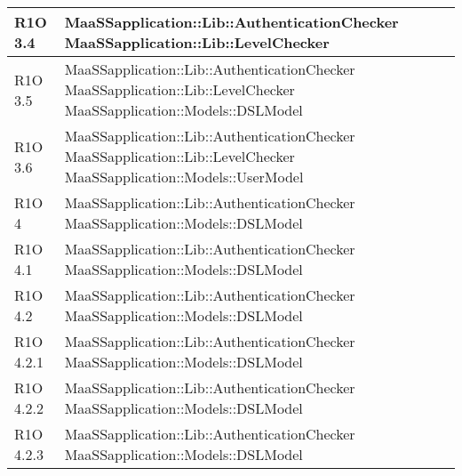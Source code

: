 \begin{center}
\begin{longtable}{ | l | p{8cm} |}
	R1O 3.4 & MaaSSapplication::Lib::AuthenticationChecker \newline MaaSSapplication::Lib::LevelChecker  \\ \hline
	
	R1O 3.5 & MaaSSapplication::Lib::AuthenticationChecker \newline MaaSSapplication::Lib::LevelChecker \newline MaaSSapplication::Models::DSLModel  \newline  \\ \hline
	
	R1O 3.6 & MaaSSapplication::Lib::AuthenticationChecker \newline MaaSSapplication::Lib::LevelChecker \newline MaaSSapplication::Models::UserModel  \newline  \\ \hline
	
	R1O 4 & MaaSSapplication::Lib::AuthenticationChecker \newline MaaSSapplication::Models::DSLModel  \newline  \\ \hline
	
	R1O 4.1 & MaaSSapplication::Lib::AuthenticationChecker \newline MaaSSapplication::Models::DSLModel  \newline  \\ \hline
	
	R1O 4.2 & MaaSSapplication::Lib::AuthenticationChecker \newline MaaSSapplication::Models::DSLModel  \newline  \\ \hline
	
	R1O 4.2.1 & MaaSSapplication::Lib::AuthenticationChecker \newline  MaaSSapplication::Models::DSLModel  \newline  \\ \hline
	
	R1O 4.2.2 & MaaSSapplication::Lib::AuthenticationChecker \newline  MaaSSapplication::Models::DSLModel  \newline  \\ \hline
	
	R1O 4.2.3 & MaaSSapplication::Lib::AuthenticationChecker \newline  MaaSSapplication::Models::DSLModel  \newline  \\ \hline
	

\end{longtable}
\end{center}
